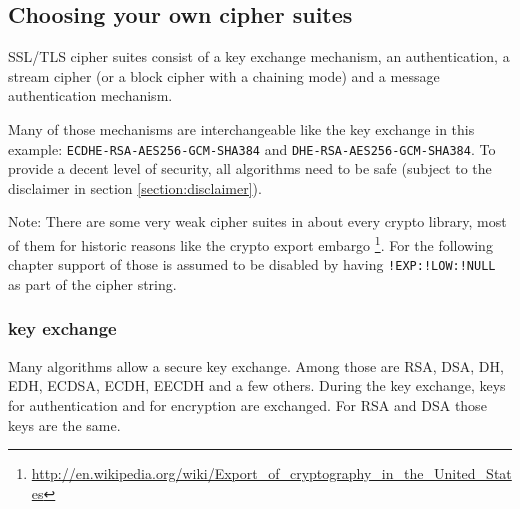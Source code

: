 \subsection{Choosing your own cipher suites}
\label{section:ChoosingYourOwnCipherSuites}


SSL/TLS cipher suites consist of a key exchange mechanism, an authentication, a
stream cipher (or a block cipher with a chaining mode) and a message authentication
mechanism.

Many of those mechanisms are interchangeable like the key exchange in this example:
\texttt{ECDHE-RSA-AES256-GCM-SHA384} and \texttt{DHE-RSA-AES256-GCM-SHA384}.
To provide a decent level of security, all algorithms need to be safe (subject to
the disclaimer in section \ref{section:disclaimer}).

Note: There are some very weak cipher suites in about every crypto library, most of
them for historic reasons like the crypto export embargo
\footnote{\url{http://en.wikipedia.org/wiki/Export_of_cryptography_in_the_United_States}}.
For the following chapter support of those is assumed to be disabled by having
\texttt{!EXP:!LOW:!NULL} as part of the cipher string.


\subsubsection{key exchange}

Many algorithms allow a secure key exchange. Among those are RSA, DSA, DH, EDH, ECDSA,
ECDH, EECDH and a few others. During the key exchange, keys for authentication and for
encryption are exchanged. For RSA and DSA those keys are the same.

